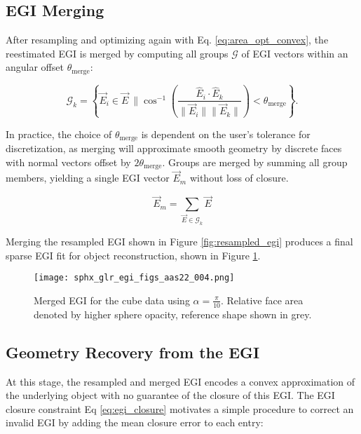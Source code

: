 \subsection{EGI Merging}

After resampling and optimizing again with Eq. \ref{eq:area_opt_convex}, the reestimated EGI is merged by computing all groups $\mathcal{G}$ of EGI vectors within an angular offset $\theta_\mathrm{merge}$:

\begin{equation} \label{eq:egi_merge}
  \mathcal{G}_k = \left\{ \vec{E}_i \in \vec{E} \:\| \cos^{-1}\left( \frac{\hat{E}_i \cdot \hat{E}_k}{\|\vec{E}_i \| \| \vec{E}_k \|}\right) < \theta_\mathrm{merge} \right\}.
\end{equation}

In practice, the choice of $\theta_\mathrm{merge}$ is dependent on the user's tolerance for discretization, as merging will approximate smooth geometry by discrete faces with normal vectors offset by $2\theta_\mathrm{merge}$. Groups are merged by summing all group members, yielding a single EGI vector $\vec{E}_m$ without loss of closure. 

\begin{equation} \label{eq:fixing_egi}
  \vec{E}_m = \sum_{\vec{E} \in \mathcal{G}_k}{\vec{E}}
\end{equation}

Merging the resampled EGI shown in Figure \ref{fig:resampled_egi} produces a final sparse EGI fit for object reconstruction, shown in Figure \ref{fig:merged_egi}. 

\begin{figure}[!htb]
  \centering
  \texttt{[image: sphx\_glr\_egi\_figs\_aas22\_004.png]}
  \caption{Merged EGI for the cube data using $\alpha = \frac{\pi}{10}$. Relative face area denoted by higher sphere opacity, reference shape shown in grey.}
  \label{fig:merged_egi}
\end{figure}

\subsection{Geometry Recovery from the EGI}

At this stage, the resampled and merged EGI encodes a convex approximation of the underlying object with no guarantee of the closure of this EGI. The EGI closure constraint Eq \ref{eq:egi_closure} motivates a simple procedure to correct an invalid EGI by adding the mean closure error to each entry:

